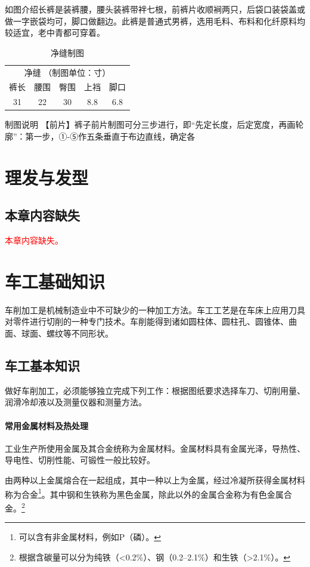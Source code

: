 \documentclass{ctexbook}
\begin{document}
如图介绍长裤是装裤腰，腰头装裤带袢七根，前裤片收顺裥两只，后袋口装袋盖或做一字嵌袋均可，脚口做翻边。此裤是普通式男裤，选用毛料、布料和化纤原料均较适宜，老中青都可穿着。

\begin{table}[htbp]
	\centering
	\caption{净缝制图}
	\begin{tabular}{ccccc}
		\multicolumn{5}{c}{净缝 （制图单位：寸）} \\
		裤长    & 腰围    & 臀围    & 上裆    & 脚口 \\
		31    & 22    & 30    & 8.8   & 6.8 \\
	\end{tabular}%
	\label{tab:jinfeng}%
\end{table}%

制图说明
【前片】裤子前片制图可分三步进行，即“先定长度，后定宽度，再画轮廓”：第一步，①-⑤作五条垂直于布边直线，确定各


\chapter{理发与发型}
\section{本章内容缺失}
\textcolor{red}{本章内容缺失。}
\chapter{车工基础知识}
车削加工是机械制造业中不可缺少的一种加工方法。车工工艺是在车床上应用刀具对零件进行切削的一种专门技术。车削能得到诸如圆柱体、圆柱孔、圆锥体、曲面、球面、螺纹等不同形状。
\section{车工基本知识}
做好车削加工，必须能够独立完成下列工作：根据图纸要求选择车刀、切削用量、润滑冷却液以及测量仪器和测量方法。
\subsubsection{常用金属材料及热处理}
工业生产所使用金属及其合金统称为金属材料。金属材料具有金属光泽，导热性、导电性、切削性能、可锻性一般比较好。

由两种以上金属熔合在一起组成，其中一种以上为金属，经过冷凝所获得金属材料称为合金\footnote{可以含有非金属材料，例如P（磷）。}。其中钢和生铁称为黑色金属，除此以外的金属合金称为有色金属合金。\footnote{根据含碳量可以分为纯铁（<0.2\%）、钢（0.2--2.1\%）和生铁（>2.1\%）。}
\end{document}

